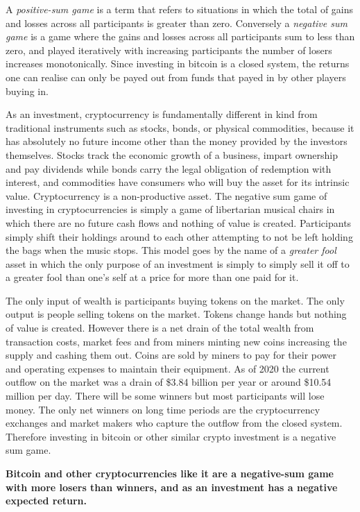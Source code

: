 A \textit{positive-sum game} is a term that refers to situations in which the
total of gains and losses across all participants is greater than zero.
Conversely a \textit{negative sum game} is a game where the gains and losses
across all participants sum to less than zero, and played iteratively with
increasing participants the number of losers increases monotonically.
Since investing in bitcoin is a closed system, the returns one can realise can
only be payed out from funds that payed in by other players buying in.

As an investment, cryptocurrency is fundamentally different in kind from
traditional instruments such as stocks, bonds, or physical commodities, because
it has absolutely no future income other than the money provided by the
investors themselves. Stocks track the economic growth of a business, impart
ownership and pay dividends while bonds carry the legal obligation of redemption
with interest, and commodities have consumers who will buy the asset for its
intrinsic value. Cryptocurrency is a non-productive asset. The negative sum game
of investing in cryptocurrencies is simply a game of libertarian musical chairs
in which there are no future cash flows and nothing of value is created.
Participants simply shift their holdings around to each other attempting to not
be left holding the bags when the music stops. This model goes by the name of a
\textit{greater fool} asset in which the only purpose of an investment is
simply to simply sell it off to a greater fool than one's self at a price for
more than one paid for it. \cite{bank2018v}

The only input of wealth is participants buying tokens on the market. The only
output is people selling tokens on the market. Tokens change hands but nothing
of value is created. However there is a net drain of the total wealth from
transaction costs, market fees and from miners minting new coins increasing the
supply and cashing them out. \cite{pyramid, catalini2016some} Coins are sold by
miners to pay for their power and operating expenses to maintain their
equipment.  As of 2020 the current outflow on the market was a drain of \$3.84
billion per year or around \$10.54 million per day. There will be some winners
but most participants will lose money. The only net winners on long time periods
are the cryptocurrency exchanges and market makers who capture the outflow from
the closed system. Therefore investing in bitcoin or other similar crypto
investment is a negative sum game.

\begin{infobox}
 \textbf{Bitcoin and other cryptocurrencies like it are a negative-sum game with
  more losers than winners, and as an investment has a negative expected
  return.}
\end{infobox}

